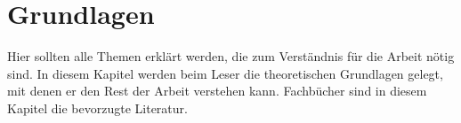 

\clearpage

\section{Grundlagen}

Hier sollten alle Themen erklärt werden, die zum Verständnis für die Arbeit nötig sind. In diesem Kapitel werden beim Leser die theoretischen Grundlagen gelegt, mit denen er den Rest der Arbeit verstehen kann. Fachbücher \citep{Helmke2016,Metelmann2016} sind in diesem Kapitel die bevorzugte Literatur. 	